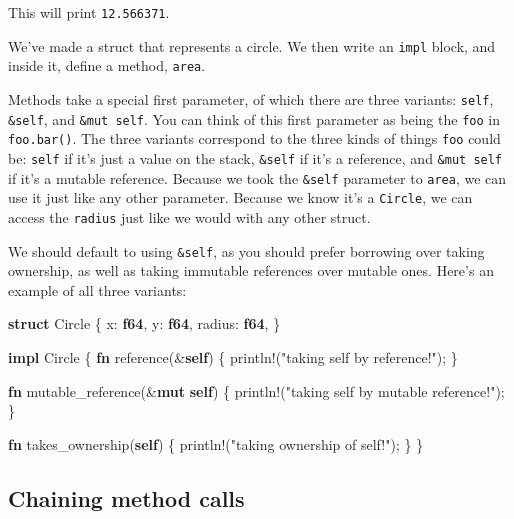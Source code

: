 \documentclass[a4paper,]{book}
\newenvironment{Shaded}{\begin{snugshade}}{\end{snugshade}}
\newcommand{\KeywordTok}[1]{\textcolor[rgb]{0.13,0.29,0.53}{\textbf{{#1}}}}
\newcommand{\StringTok}[1]{\textcolor[rgb]{0.31,0.60,0.02}{{#1}}}
\newcommand{\OtherTok}[1]{\textcolor[rgb]{0.56,0.35,0.01}{{#1}}}
\newcommand{\NormalTok}[1]{{#1}}
\begin{document}
This will print \texttt{12.566371}.

We've made a struct that represents a circle. We then write an
\texttt{impl} block, and inside it, define a method, \texttt{area}.

Methods take a special first parameter, of which there are three
variants: \texttt{self}, \texttt{\&self}, and \texttt{\&mut\ self}. You
can think of this first parameter as being the \texttt{foo} in
\texttt{foo.bar()}. The three variants correspond to the three kinds of
things \texttt{foo} could be: \texttt{self} if it's just a value on the
stack, \texttt{\&self} if it's a reference, and \texttt{\&mut\ self} if
it's a mutable reference. Because we took the \texttt{\&self} parameter
to \texttt{area}, we can use it just like any other parameter. Because
we know it's a \texttt{Circle}, we can access the \texttt{radius} just
like we would with any other struct.

We should default to using \texttt{\&self}, as you should prefer
borrowing over taking ownership, as well as taking immutable references
over mutable ones. Here's an example of all three variants:

\begin{Shaded}
\begin{Highlighting}[]
\KeywordTok{struct} \NormalTok{Circle \{}
    \NormalTok{x: }\KeywordTok{f64}\NormalTok{,}
    \NormalTok{y: }\KeywordTok{f64}\NormalTok{,}
    \NormalTok{radius: }\KeywordTok{f64}\NormalTok{,}
\NormalTok{\}}

\KeywordTok{impl} \NormalTok{Circle \{}
    \KeywordTok{fn} \NormalTok{reference(&}\KeywordTok{self}\NormalTok{) \{}
       \OtherTok{println!}\NormalTok{(}\StringTok{"taking self by reference!"}\NormalTok{);}
    \NormalTok{\}}

    \KeywordTok{fn} \NormalTok{mutable_reference(&}\KeywordTok{mut} \KeywordTok{self}\NormalTok{) \{}
       \OtherTok{println!}\NormalTok{(}\StringTok{"taking self by mutable reference!"}\NormalTok{);}
    \NormalTok{\}}

    \KeywordTok{fn} \NormalTok{takes_ownership(}\KeywordTok{self}\NormalTok{) \{}
       \OtherTok{println!}\NormalTok{(}\StringTok{"taking ownership of self!"}\NormalTok{);}
    \NormalTok{\}}
\NormalTok{\}}
\end{Highlighting}
\end{Shaded}

\subsection{Chaining method calls}\label{chaining-method-calls}
\end{document}
